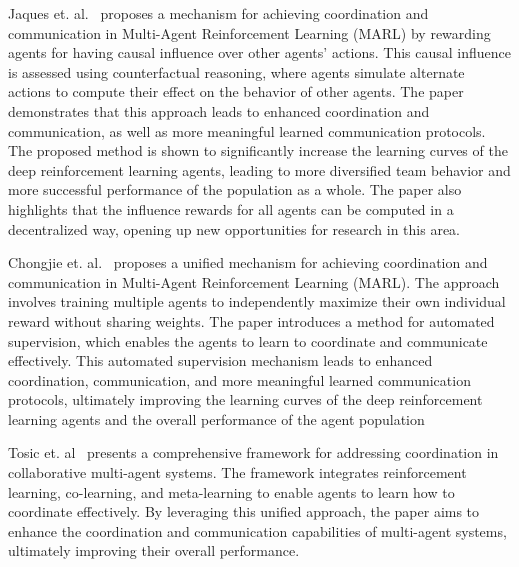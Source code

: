 \documentclass[runningheads]{llncs}
\begin{document}
Jaques et. al.~\cite{Jaques2019} proposes a mechanism for achieving coordination and communication in Multi-Agent Reinforcement Learning (MARL) by rewarding agents for having causal influence over other agents' actions. This causal influence is assessed using counterfactual reasoning, where agents simulate alternate actions to compute their effect on the behavior of other agents. The paper demonstrates that this approach leads to enhanced coordination and communication, as well as more meaningful learned communication protocols. The proposed method is shown to significantly increase the learning curves of the deep reinforcement learning agents, leading to more diversified team behavior and more successful performance of the population as a whole. The paper also highlights that the influence rewards for all agents can be computed in a decentralized way, opening up new opportunities for research in this area.

Chongjie et. al.~\cite{Chongjie2008} proposes a unified mechanism for achieving coordination and communication in Multi-Agent Reinforcement Learning (MARL). The approach involves training multiple agents to independently maximize their own individual reward without sharing weights. The paper introduces a method for automated supervision, which enables the agents to learn to coordinate and communicate effectively. This automated supervision mechanism leads to enhanced coordination, communication, and more meaningful learned communication protocols, ultimately improving the learning curves of the deep reinforcement learning agents and the overall performance of the agent population

Tosic et. al~\cite{Tosic2010} presents a comprehensive framework for addressing coordination in collaborative multi-agent systems. The framework integrates reinforcement learning, co-learning, and meta-learning to enable agents to learn how to coordinate effectively. By leveraging this unified approach, the paper aims to enhance the coordination and communication capabilities of multi-agent systems, ultimately improving their overall performance.

\end{document}
